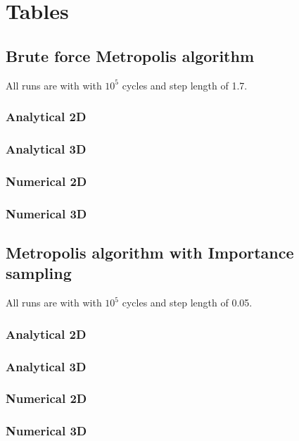 \newpage
\section{Tables}
\subsection{Brute force Metropolis algorithm}
All runs are with with $10^5$ cycles and step length
of 1.7.
%
\subsubsection{Analytical 2D}

\subsubsection{Analytical 3D}

%
\newpage
\subsubsection{Numerical 2D}

\subsubsection{Numerical 3D}

\newpage
\subsection{Metropolis algorithm with Importance sampling}
All runs are with with $10^5$ cycles and step length
of 0.05.
%
\subsubsection{Analytical 2D}

\subsubsection{Analytical 3D}

%
\subsubsection{Numerical 2D}

\subsubsection{Numerical 3D}

